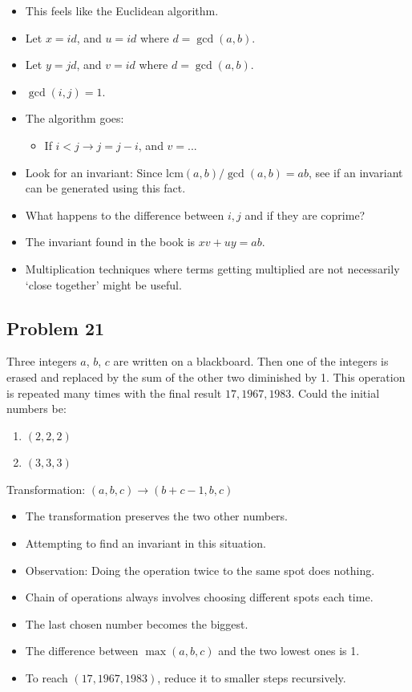 \documentclass[12pt,tikz,border=10pt]{article}
\theoremstyle{definition}
\theoremstyle{remark}
\begin{document}
\begin{itemize}
    \item This feels like the Euclidean algorithm. 
    \item Let $x = id$, and $u = id$ where $d = \gcd(a,b)$.
    \item Let $y = jd$, and $v = id$ where $d = \gcd(a,b)$.
    \item $\gcd(i,j) = 1$.
    \item The algorithm goes:
    \begin{itemize}
        \item If $i < j \rightarrow j = j-i$, and $v = ...$
    \end{itemize}
    \item Look for an invariant: Since $\text{lcm}(a,b) / \gcd(a,b) = a b$, see if an invariant can be generated using this fact.
    \item What happens to the difference between $i,j$ and if they are coprime?
    \item The invariant found in the book is $xv + uy = ab$.
    \item Multiplication techniques where terms getting multiplied are not necessarily ‘close together’ might be useful.
\end{itemize}

\subsection{Problem 21}
Three integers $a$, $b$, $c$ are written on a blackboard. Then one of the integers is erased
and replaced by the sum of the other two diminished by 1. This operation is repeated
many times with the final result $17, 1967, 1983$. Could the initial numbers be:
\begin{enumerate}
    \item $(2, 2, 2)$
    \item $(3, 3, 3)$
\end{enumerate}

Transformation: $(a,b,c) \rightarrow (b+c-1,b,c)$

\begin{itemize}
    \item The transformation preserves the two other numbers.
    \item Attempting to find an invariant in this situation.
    \item Observation: Doing the operation twice to the same spot does nothing.
    \item Chain of operations always involves choosing different spots each time.
    \item The last chosen number becomes the biggest.
    \item The difference between $\max(a,b,c)$ and the two lowest ones is 1.
    \item To reach $(17,1967,1983)$, reduce it to smaller steps recursively.
\end{itemize}
\end{document}
